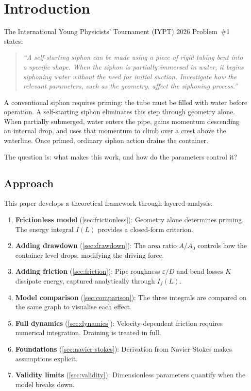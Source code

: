 \documentclass[11pt]{article}
\begin{document}
\tableofcontents
\newpage

\section{Introduction}
\label{sec:intro}

The International Young Physicists' Tournament (IYPT) 2026 Problem~\#1 states:
\begin{quote}
\emph{``A self-starting siphon can be made using a piece of rigid tubing bent into a specific shape. When the siphon is partially immersed in water, it begins siphoning water without the need for initial suction. Investigate how the relevant parameters, such as the geometry, affect the siphoning process.''}
\end{quote}

A conventional siphon requires priming: the tube must be filled with water before operation. A self-starting siphon eliminates this step through geometry alone. When partially submerged, water enters the pipe, gains momentum descending an internal drop, and uses that momentum to climb over a crest above the waterline. Once primed, ordinary siphon action drains the container.

The question is: what makes this work, and how do the parameters control it?

\subsection{Approach}

This paper develops a theoretical framework through layered analysis:

\begin{enumerate}[nosep,leftmargin=2em]
  \item \textbf{Frictionless model} (\cref{sec:frictionless}): Geometry alone determines priming. The energy integral $I(L)$ provides a closed-form criterion.
  \item \textbf{Adding drawdown} (\cref{sec:drawdown}): The area ratio $A/A_0$ controls how the container level drops, modifying the driving force.
  \item \textbf{Adding friction} (\cref{sec:friction}): Pipe roughness $\varepsilon/D$ and bend losses $K$ dissipate energy, captured analytically through $I_f(L)$.
  \item \textbf{Model comparison} (\cref{sec:comparison}): The three integrals are compared on the same graph to visualise each effect.
  \item \textbf{Full dynamics} (\cref{sec:dynamics}): Velocity-dependent friction requires numerical integration. Draining is treated in full.
  \item \textbf{Foundations} (\cref{sec:navier-stokes}): Derivation from Navier-Stokes makes assumptions explicit.
  \item \textbf{Validity limits} (\cref{sec:validity}): Dimensionless parameters quantify when the model breaks down.
\end{enumerate}
\end{document}
